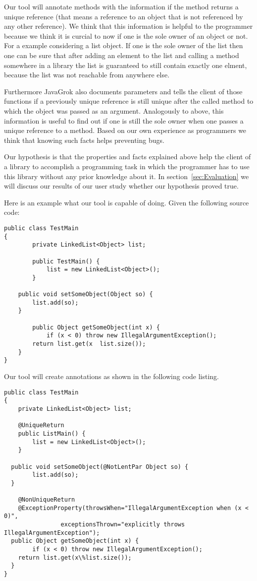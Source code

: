 Our tool will annotate methods with the information if the method returns a 
unique reference (that means a reference to an object that is not referenced 
by any other reference). We think that this information is helpful to the 
programmer because we think it is curcial to now if one is the sole owner of 
an object or not. For a example considering a list object. If one is the sole
owner of the list then one can be sure that after adding an element to the list
and calling a method somewhere in a library the list is guaranteed to still 
contain exactly one elment, because the list was not reachable from anywhere
else.

Furthermore JavaGrok also documents parameters and tells the client
of those functions if a previously unique reference is still unique after the 
called method to which the object was passed as an argument. Analogously to 
above, this information is useful to find out if one is still the sole owner
when one passes a unique reference to a method. Based on our own experience
as programmers we think that knowing such facts helps preventing bugs.

Our hypothesis is that the properties and facts explained above help the 
client of a library to accomplish a programming task in which the programmer
has to use this library without any prior knowledge about it.
In section~\ref{sec:Evaluation} we will discuss our results of our user study
whether our hypothesis proved true.

Here is an example what our tool is capable of doing. Given the following
source code:

\begin{lstlisting}
public class TestMain
{
		private LinkedList<Object> list;
		
		public TestMain() {
			list = new LinkedList<Object>();
		}
		
    public void setSomeObject(Object so) {
    	list.add(so);
    }
    
		public Object getSomeObject(int x) {
			if (x < 0) throw new IllegalArgumentException();
    	return list.get(x  list.size());
    }
}
\end{lstlisting}

Our tool will create annotations as shown in the following code listing.

\begin{lstlisting}
public class TestMain
{
	private LinkedList<Object> list;

	@UniqueReturn
	public ListMain() {
		list = new LinkedList<Object>();
	}
		
  public void setSomeObject(@NotLentPar Object so) {
		list.add(so);
  }
		
	@NonUniqueReturn
	@ExceptionProperty(throwsWhen="IllegalArgumentException when (x < 0)", 
				exceptionsThrown="explicitly throws IllegalArgumentException");
  public Object getSomeObject(int x) {
		if (x < 0) throw new IllegalArgumentException();
   	return list.get(x\%list.size());
  }
}
\end{lstlisting}